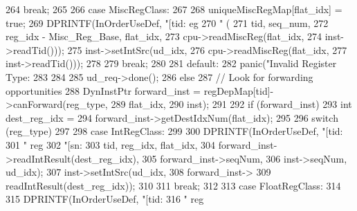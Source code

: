 \begin{DoxyCode}
{{{{{264                     break;
265 
266                   case MiscRegClass:
267                     {
268                         uniqueMiscRegMap[flat_idx] = true;
269                         DPRINTF(InOrderUseDef, "[tid:%
      eg %
270                                 " (%
271                                 tid, seq_num,
272                                 reg_idx - Misc_Reg_Base, flat_idx,
273                                 cpu->readMiscReg(flat_idx,
274                                 inst->readTid()));
275                         inst->setIntSrc(ud_idx,
276                                         cpu->readMiscReg(flat_idx,
277                                                          inst->readTid()));
278                     }
279                     break;
280 
281                   default:
282                     panic("Invalid Register Type: %
283                 }
284 
285                 ud_req->done();
286             } else {
287                 // Look for forwarding opportunities
288                 DynInstPtr forward_inst = regDepMap[tid]->canForward(reg_type,
289                                                                      flat_idx,
290                                                                      inst);
291 
292                 if (forward_inst) {
293                     int dest_reg_idx =
294                         forward_inst->getDestIdxNum(flat_idx);
295 
296                     switch (reg_type)
297                     {
298                       case IntRegClass:
299                         {
300                             DPRINTF(InOrderUseDef, "[tid:%
301                                     " reg %
302                                     "[sn:%
303                                     tid, reg_idx, flat_idx,
304                                     forward_inst->readIntResult(dest_reg_idx),
305                                     forward_inst->seqNum, 
306                                     inst->seqNum, ud_idx);
307                             inst->setIntSrc(ud_idx, 
308                                             forward_inst->
309                                             readIntResult(dest_reg_idx));
310                         }
311                         break;
312 
313                       case FloatRegClass:
314                         {
315                             DPRINTF(InOrderUseDef, "[tid:%
316                                     " reg %
}}}}}}}
\end{DoxyCode}
